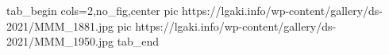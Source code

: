  
 
 
 
 


\ifcmt
  tab_begin cols=2,no_fig,center
     pic https://lgaki.info/wp-content/gallery/ds-2021/MMM_1881.jpg
     pic https://lgaki.info/wp-content/gallery/ds-2021/MMM_1950.jpg
  tab_end
\fi
